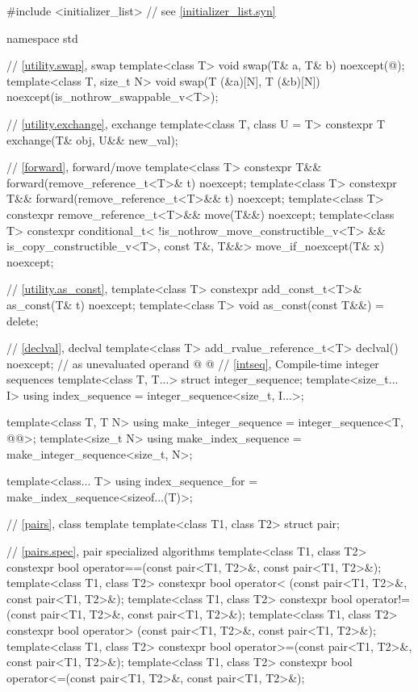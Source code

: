 \begin{codeblock}
#include <initializer_list>     // see \ref{initializer_list.syn}

namespace std {
  // \ref{utility.swap}, swap
  template<class T>
    void swap(T& a, T& b) noexcept(@\seebelow@);
  template<class T, size_t N>
    void swap(T (&a)[N], T (&b)[N]) noexcept(is_nothrow_swappable_v<T>);

  // \ref{utility.exchange}, exchange
  template<class T, class U = T>
    constexpr T exchange(T& obj, U&& new_val);

  // \ref{forward}, forward/move
  template<class T>
    constexpr T&& forward(remove_reference_t<T>& t) noexcept;
  template<class T>
    constexpr T&& forward(remove_reference_t<T>&& t) noexcept;
  template<class T>
    constexpr remove_reference_t<T>&& move(T&&) noexcept;
  template<class T>
    constexpr conditional_t<
        !is_nothrow_move_constructible_v<T> && is_copy_constructible_v<T>, const T&, T&&>
      move_if_noexcept(T& x) noexcept;

  // \ref{utility.as_const}, 
  template<class T>
    constexpr add_const_t<T>& as_const(T& t) noexcept;
  template<class T>
    void as_const(const T&&) = delete;

  // \ref{declval}, declval
  template<class T>
    add_rvalue_reference_t<T> declval() noexcept;  // as unevaluated operand
@%
%
%
%
@
  // \ref{intseq}, Compile-time integer sequences
  template<class T, T...>
    struct integer_sequence;
  template<size_t... I>
    using index_sequence = integer_sequence<size_t, I...>;

  template<class T, T N>
    using make_integer_sequence = integer_sequence<T, @\seebelow{}@>;
  template<size_t N>
    using make_index_sequence = make_integer_sequence<size_t, N>;

  template<class... T>
    using index_sequence_for = make_index_sequence<sizeof...(T)>;

  // \ref{pairs}, class template 
  template<class T1, class T2>
    struct pair;

  // \ref{pairs.spec}, pair specialized algorithms
  template<class T1, class T2>
    constexpr bool operator==(const pair<T1, T2>&, const pair<T1, T2>&);
  template<class T1, class T2>
    constexpr bool operator< (const pair<T1, T2>&, const pair<T1, T2>&);
  template<class T1, class T2>
    constexpr bool operator!=(const pair<T1, T2>&, const pair<T1, T2>&);
  template<class T1, class T2>
    constexpr bool operator> (const pair<T1, T2>&, const pair<T1, T2>&);
  template<class T1, class T2>
    constexpr bool operator>=(const pair<T1, T2>&, const pair<T1, T2>&);
  template<class T1, class T2>
    constexpr bool operator<=(const pair<T1, T2>&, const pair<T1, T2>&);

}
\end{codeblock}
